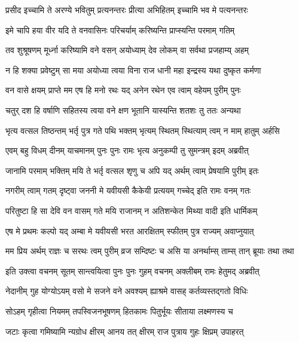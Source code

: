 \twolineshloka
{प्रसीद इच्चामि ते अरण्ये भवितुम् प्रत्यनन्तरः}
{प्रीत्या अभिहितम् इच्चामि भव मे पत्यनन्तरः} %

\twolineshloka
{इमे चापि हया वीर यदि ते वनवासिनः}
{परिचर्याम् करिष्यन्ति प्राप्स्यन्ति परमाम् गतिम्} %

\twolineshloka
{तव शुश्रूषणम् मूर्ध्ना करिष्यामि वने वसन्}
{अयोध्याम् देव लोकम् वा सर्वथा प्रजहाम्य् अहम्} %

\twolineshloka
{न हि शक्या प्रवेष्टुम् सा मया अयोध्या त्वया विना}
{राज धानी महा इन्द्रस्य यथा दुष्कृत कर्मणा} %

\twolineshloka
{वन वासे क्षयम् प्राप्ते मम एष हि मनो रथः}
{यद् अनेन रथेन एव त्वाम् वहेयम् पुरीम् पुनः} %

\twolineshloka
{चतुर् दश हि वर्षाणि सहितस्य त्वया वने}
{क्षण भूतानि यास्यन्ति शतशः तु ततः अन्यथा} %

\twolineshloka
{भृत्य वत्सल तिष्ठन्तम् भर्तृ पुत्र गते पथि}
{भक्तम् भृत्यम् स्थितम् स्थित्याम् त्वम् न माम् हातुम् अर्हसि} %

\twolineshloka
{एवम् बहु विधम् दीनम् याचमानम् पुनः पुनः}
{रामः भृत्य अनुकम्पी तु सुमन्त्रम् इदम् अब्रवीत्} %

\twolineshloka
{जानामि परमाम् भक्तिम् मयि ते भर्तृ वत्सल}
{शृणु च अपि यद् अर्थम् त्वाम् प्रेषयामि पुरीम् इतः} %

\twolineshloka
{नगरीम् त्वाम् गतम् दृष्ट्वा जननी मे यवीयसी}
{कैकेयी प्रत्ययम् गच्चेद् इति रामः वनम् गतः} %

\twolineshloka
{परितुष्टा हि सा देवि वन वासम् गते मयि}
{राजानम् न अतिशन्केत मिथ्या वादी इति धार्मिकम्} %

\twolineshloka
{एष मे प्रथमः कल्पो यद् अम्बा मे यवीयसी}
{भरत आरक्षितम् स्फीतम् पुत्र राज्यम् अवाप्नुयात्} %

\twolineshloka
{मम प्रिय अर्थम् राज्ञः च सरथः त्वम् पुरीम् व्रज}
{सम्दिष्टः च असि या अनर्थाम्स् ताम्स् तान् ब्रूयाः तथा तथा} %

\twolineshloka
{इति उक्त्वा वचनम् सूतम् सान्त्वयित्वा पुनः पुनः}
{गुहम् वचनम् अक्लीबम् रामः हेतुमद् अब्रवीत्} %

\twolineshloka
{नेदानीम् गुह योग्योऽयम् वसो मे सजने वने}
{अवश्यम् ह्याश्रमे वासह् कर्तव्यस्तद्गतो विधिः} %

\twolineshloka
{सोऽहम् गृहीत्वा नियमम् तपस्विजनभूषणम्}
{हितकामः पितुर्भूयः सीताया लक्ष्मणस्य च} %

\twolineshloka
{जटाः कृत्वा गमिष्यामि न्यग्रोध क्षीरम् आनय}
{तत् क्षीरम् राज पुत्राय गुहः क्षिप्रम् उपाहरत्} %

